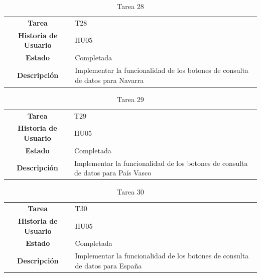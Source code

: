 \begin{table}[H]
	\begin{center}
		\begin{tabular}{| c | p{9cm} |}
			\hline
			
			\textbf{Tarea} & T28 \\
			\textbf{Historia de Usuario} & HU05 \\
			\textbf{Estado} & Completada \\
			\textbf{Descripción} & Implementar la funcionalidad de los botones de consulta de datos para Navarra \\ \hline
		\end{tabular}
		\caption{Tarea 28}
	\end{center}
\end{table}

\begin{table}[H]
	\begin{center}
		\begin{tabular}{| c | p{9cm} |}
			\hline
			
			\textbf{Tarea} & T29 \\
			\textbf{Historia de Usuario} & HU05 \\
			\textbf{Estado} & Completada \\
			\textbf{Descripción} & Implementar la funcionalidad de los botones de consulta de datos para País Vasco \\ \hline
		\end{tabular}
		\caption{Tarea 29}
	\end{center}
\end{table}

\begin{table}[H]
	\begin{center}
		\begin{tabular}{| c | p{9cm} |}
			\hline
			
			\textbf{Tarea} & T30 \\
			\textbf{Historia de Usuario} & HU05 \\
			\textbf{Estado} & Completada \\
			\textbf{Descripción} & Implementar la funcionalidad de los botones de consulta de datos para España \\ \hline
		\end{tabular}
		\caption{Tarea 30}
	\end{center}
\end{table}


